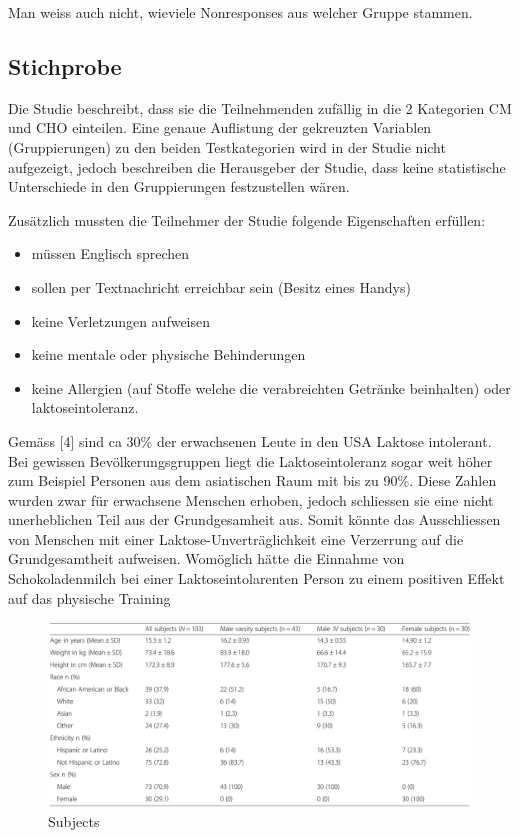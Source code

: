 \documentclass[
]{article}
\providecommand{\tightlist}{%
  \setlength{\itemsep}{0pt}\setlength{\parskip}{0pt}}
\begin{document}
Man weiss auch nicht, wieviele Nonresponses aus welcher Gruppe stammen.

\hypertarget{stichprobe}{%
\subsection{Stichprobe}\label{stichprobe}}

Die Studie beschreibt, dass sie die Teilnehmenden zufällig in die 2
Kategorien CM und CHO einteilen. Eine genaue Auflistung der gekreuzten
Variablen (Gruppierungen) zu den beiden Testkategorien wird in der
Studie nicht aufgezeigt, jedoch beschreiben die Herausgeber der Studie,
dass keine statistische Unterschiede in den Gruppierungen festzustellen
wären.

Zusätzlich mussten die Teilnehmer der Studie folgende Eigenschaften
erfüllen:

\begin{itemize}
\tightlist
\item
  müssen Englisch sprechen
\item
  sollen per Textnachricht erreichbar sein (Besitz eines Handys)
\item
  keine Verletzungen aufweisen
\item
  keine mentale oder physische Behinderungen
\item
  keine Allergien (auf Stoffe welche die verabreichten Getränke
  beinhalten) oder laktoseintoleranz.
\end{itemize}

Gemäss {[}4{]} sind ca 30\% der erwachsenen Leute in den USA Laktose
intolerant. Bei gewissen Bevölkerungsgruppen liegt die Laktoseintoleranz
sogar weit höher zum Beispiel Personen aus dem asiatischen Raum mit bis
zu 90\%. Diese Zahlen wurden zwar für erwachsene Menschen erhoben,
jedoch schliessen sie eine nicht unerheblichen Teil aus der
Grundgesamheit aus. Somit könnte das Ausschliessen von Menschen mit
einer Laktose-Unverträglichkeit eine Verzerrung auf die Grundgesamtheit
aufweisen. Womöglich hätte die Einnahme von Schokoladenmilch bei einer
Laktoseintolarenten Person zu einem positiven Effekt auf das physische
Training

\begin{figure}

{\centering \includegraphics[width=1\linewidth]{subjects} 

}

\caption{Subjects}\label{fig:subjects}
\end{figure}
\end{document}
